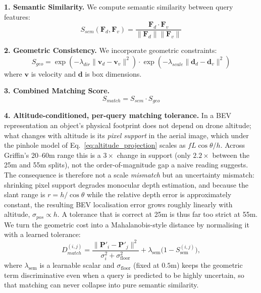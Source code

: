 \documentclass[9.5pt,twocolumn,a4paper]{IEEEtran}
\def\mb#1{\mathbf{#1}}
\begin{document}
\textbf{1. Semantic Similarity.} We compute semantic similarity between query features:
\begin{equation}
    S_{sem}(\mb{F}_d, \mb{F}_v) = \frac{\mb{F}_d \cdot \mb{F}_v}{\|\mb{F}_d\| \|\mb{F}_v\|}
    \label{eq:semantic_sim}
\end{equation}

\textbf{2. Geometric Consistency.} We incorporate geometric constraints:
\begin{equation}
    S_{geo} = \exp(-\lambda_{dir}\| \mb{v}_d - \mb{v}_v\|^2) \cdot \exp(-\lambda_{scale}\| \mb{d}_d - \mb{d}_v\|^2)
    \label{eq:geometry_consistency}
\end{equation}
where $\mb{v}$ is velocity and $\mb{d}$ is box dimensions.

\textbf{3. Combined Matching Score.}
\begin{equation}
    S_{match} = S_{sem} \cdot S_{geo}
    \label{eq:matching_score}
\end{equation}

\textbf{4. Altitude-conditioned, per-query matching tolerance.} In a BEV representation an object's physical footprint does not depend on drone altitude; what changes with altitude is its \emph{pixel support} in the aerial image, which under the pinhole model of Eq.~\ref{eq:altitude_projection} scales as $f L \cos\theta / h$. Across Griffin's 20--60m range this is a $3\times$ change in support (only $2.2\times$ between the 25m and 55m splits), not the order-of-magnitude gap a naive reading suggests. The consequence is therefore not a scale \emph{mismatch} but an uncertainty mismatch: shrinking pixel support degrades monocular depth estimation, and because the slant range is $r = h/\cos\theta$ while the relative depth error is approximately constant, the resulting BEV localisation error grows roughly linearly with altitude, $\sigma_{pos} \propto h$. A tolerance that is correct at 25m is thus far too strict at 55m. We turn the geometric cost into a Mahalanobis-style distance by normalising it with a learned tolerance:
\begin{equation}
    D_{match}^{(i,j)} = \frac{\|\mb{P}'_{i} - \mb{P}'_{j}\|^{2}}{\sigma_i^{2} + \sigma_{\text{floor}}^{2}} + \lambda_{\text{sem}}\big(1 - S^{(i,j)}_{\text{sem}}\big),
    \label{eq:matching_distance}
\end{equation}
where $\lambda_{\text{sem}}$ is a learnable scalar and $\sigma_{\text{floor}}$ (fixed at $0.5$m) keeps the geometric term discriminative even when a query is predicted to be highly uncertain, so that matching can never collapse into pure semantic similarity.
\end{document}
